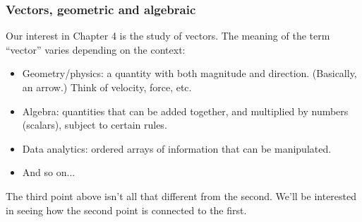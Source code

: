 \documentclass[11pt,t]{beamer}
\begin{document}
\begin{frame}
\frametitle{Vectors, geometric and algebraic}
Our interest in Chapter 4 is the study of \alert{vectors}. The meaning of the term ``vector'' varies depending on the context:
\begin{itemize}
\item Geometry/physics: a quantity with both \alert{magnitude} and \alert{direction}. (Basically, an arrow.) Think of velocity, force, etc.
\item Algebra: quantities that can be added together, and multiplied by numbers (scalars), subject to certain rules.
\item Data analytics: ordered arrays of information that can be manipulated.
\item And so on...
\end{itemize}
The third point above isn't all that different from the second. We'll be interested in seeing how the second point is connected to the first.
\end{frame}
\end{document}
